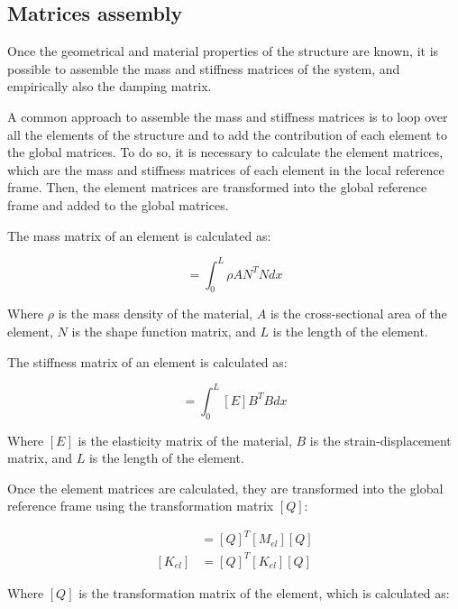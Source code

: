 \subsection{Matrices assembly}
\label{sub:matrices_assembly}

Once the geometrical and material properties of the structure are known, it is possible to assemble the mass and stiffness matrices of the system, and empirically also the damping matrix.

A common approach to assemble the mass and stiffness matrices is to loop over all the elements of the structure and to add the contribution of each element to the global matrices.
To do so, it is necessary to calculate the element matrices, which are the mass and stiffness matrices of each element in the local reference frame.
Then, the element matrices are transformed into the global reference frame and added to the global matrices.

The mass matrix of an element is calculated as:

\begin{equation}
    [M_{el}] = \int_{0}^{L} \rho A N^T N dx
\end{equation}

Where $\rho$ is the mass density of the material, $A$ is the cross-sectional area of the element, $N$ is the shape function matrix, and $L$ is the length of the element.

The stiffness matrix of an element is calculated as:

\begin{equation}
    [K_{el}] = \int_{0}^{L} [E] B^T B dx
\end{equation}

Where $[E]$ is the elasticity matrix of the material, $B$ is the strain-displacement matrix, and $L$ is the length of the element.

Once the element matrices are calculated, they are transformed into the global reference frame using the transformation matrix $[Q]$:

\begin{align}
    [M_{el}] & = [Q]^T [M_{el}] [Q] \\
    [K_{el}] & = [Q]^T [K_{el}] [Q]
\end{align}

Where $[Q]$ is the transformation matrix of the element, which is calculated as:

